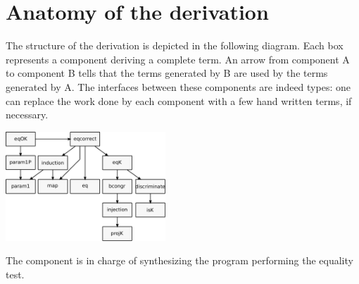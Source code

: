 \documentclass[sigplan,10pt,review]{acmart}\settopmatter{printfolios=true,printccs=false,printacmref=false}
\newcommand{\derive}[1]{\keys{#1}}
\begin{document}
\section{Anatomy of the derivation} %
\label{sec:code}

The structure of the derivation is depicted in the following diagram.
Each box represents a component deriving a complete term.
An arrow from component A to component B tells that the terms
generated by B are used by the terms generated by A. The interfaces
between these components are indeed types: one can replace the work
done by each component with a few hand written terms, if necessary.

\includegraphics[width=0.45\textwidth]{derive.pdf}

The \derive{eq} component is in charge of synthesizing the program
performing the equality test.
\end{document}
